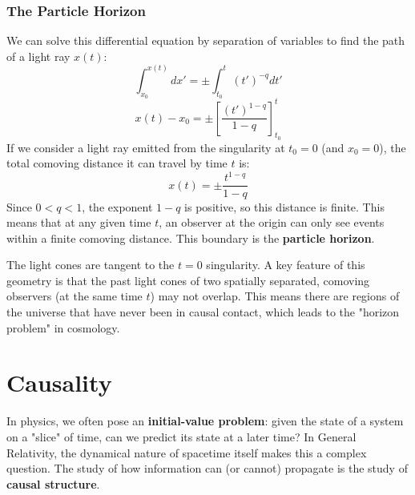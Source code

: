 \documentclass[11pt, a4paper]{report}
\begin{document}
\subsubsection*{The Particle Horizon}
We can solve this differential equation by separation of variables to find the path of a light ray $x(t)$:
\[
    \int_{x_0}^{x(t)} dx' = \pm \int_{t_0}^{t} (t')^{-q} dt'
\]
\[
    x(t) - x_0 = \pm \left[ \frac{(t')^{1-q}}{1-q} \right]_{t_0}^{t}
\]
If we consider a light ray emitted from the singularity at $t_0=0$ (and $x_0=0$), the total comoving distance it can travel by time $t$ is:
\[
    x(t) = \pm \frac{t^{1-q}}{1-q}
\]
Since $0 < q < 1$, the exponent $1-q$ is positive, so this distance is finite. This means that at any given time $t$, an observer at the origin can only see events within a finite comoving distance. This boundary is the \textbf{particle horizon}.









The light cones are tangent to the $t=0$ singularity. A key feature of this geometry is that the past light cones of two spatially separated, comoving observers (at the same time $t$) may not overlap. This means there are regions of the universe that have never been in causal contact, which leads to the "horizon problem" in cosmology.

\section{Causality}

In physics, we often pose an \textbf{initial-value problem}: given the state of a system on a "slice" of time, can we predict its state at a later time? In General Relativity, the dynamical nature of spacetime itself makes this a complex question. The study of how information can (or cannot) propagate is the study of \textbf{causal structure}.
\end{document}

